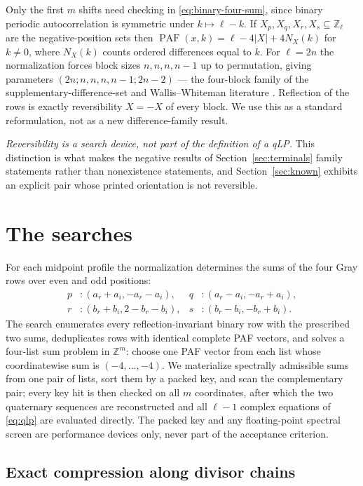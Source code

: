 \documentclass[11pt]{article}
\newcommand{\PAF}{\operatorname{PAF}}
\begin{document}
Only the first $m$ shifts need checking in \eqref{eq:binary-four-sum}, since
binary periodic autocorrelation is symmetric under $k\mapsto\ell-k$.  If
$X_p,X_q,X_r,X_s\subseteq\mathbb{Z}_\ell$ are the negative-position sets then
$\PAF(x,k)=\ell-4|X|+4N_X(k)$ for $k\neq0$, where $N_X(k)$ counts ordered
differences equal to $k$.  For $\ell=2n$ the normalization forces block sizes
$n,n,n,n-1$ up to permutation, giving parameters $(2n;n,n,n,n-1;2n-2)$ --- the
four-block family of the supplementary-difference-set and Wallis--Whiteman
literature
\cite{wallis-whiteman-1972,dokovic-2009-sds-symmetry,leung-momihara-xiang-2021}.
Reflection of the rows is exactly reversibility $X=-X$ of every block.  We use
this as a standard reformulation, not as a new difference-family result.

\emph{Reversibility is a search device, not part of the definition of a
qLP.}  This distinction is what makes the negative results of
Section~\ref{sec:terminals} family statements rather than nonexistence
statements, and Section~\ref{sec:known} exhibits an explicit pair whose
printed orientation is not reversible.

\section{The searches}
\label{sec:searches}

For each midpoint profile the normalization determines the sums of the four
Gray rows over even and odd positions:
\begin{align*}
 p &: (a_r+a_i,-a_r-a_i),&
 q &: (a_r-a_i,-a_r+a_i),\\
 r &: (b_r+b_i,2-b_r-b_i),&
 s &: (b_r-b_i,-b_r+b_i).
\end{align*}
The search enumerates every reflection-invariant binary row with the
prescribed two sums, deduplicates rows with identical complete PAF vectors,
and solves a four-list sum problem in $\mathbb{Z}^{m}$: choose one PAF vector
from each list whose coordinatewise sum is $(-4,\dots,-4)$.  We materialize
spectrally admissible sums from one pair of lists, sort them by a packed
key, and scan the complementary pair; every key hit is then checked on all
$m$ coordinates, after which the two quaternary sequences are reconstructed
and all $\ell-1$ complex equations of \eqref{eq:qlp} are evaluated directly.
The packed key and any floating-point spectral screen are performance devices
only, never part of the acceptance criterion.

\subsection*{Exact compression along divisor chains}
\end{document}
